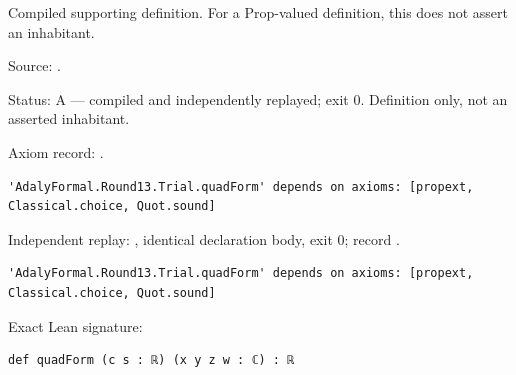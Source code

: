 \begin{definition}[bp-394]
\label{bp-394}
\uses{}
\leanok
Compiled supporting definition. For a Prop-valued definition, this does not assert an inhabitant.

\par Source: \texttt{}.
\par Status: A — compiled and independently replayed; exit 0. Definition only, not an asserted inhabitant.
\par Axiom record: \texttt{}.
\begin{verbatim}
'AdalyFormal.Round13.Trial.quadForm' depends on axioms: [propext, Classical.choice, Quot.sound]
\end{verbatim}
\par Independent replay: \texttt{}, identical declaration body, exit 0; record \texttt{}.
\begin{verbatim}
'AdalyFormal.Round13.Trial.quadForm' depends on axioms: [propext, Classical.choice, Quot.sound]
\end{verbatim}
\par Exact Lean signature:
\begin{verbatim}
def quadForm (c s : ℝ) (x y z w : ℂ) : ℝ
\end{verbatim}
\end{definition}

